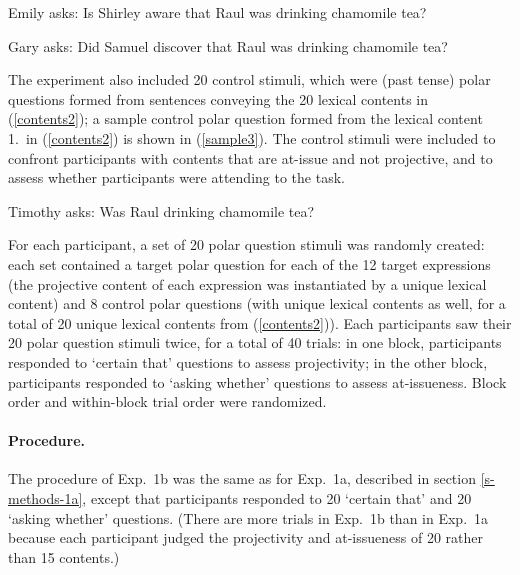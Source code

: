 \documentclass[11pt,fleqn]{article}
\newcommand{\6}{\mbox{$[\hspace*{-.6mm}[$}}
\newcommand{\9}{\mbox{$]\hspace*{-.6mm}]$}}
\begin{document}
\begin{exe}
\ex\label{sample2}
\begin{xlist}
\ex Emily asks: Is Shirley aware that Raul was drinking chamomile tea?

\ex Gary asks: Did Samuel discover that Raul was drinking chamomile tea?
\end{xlist}
\end{exe}

The experiment also included 20 control stimuli, which were (past tense) polar questions formed from sentences conveying the 20 lexical contents in (\ref{contents2}); a sample control polar question formed from the lexical content 1.\ in (\ref{contents2}) is shown in (\ref{sample3}). The control stimuli were included to confront participants with contents that are at-issue and not projective, and to assess whether participants were attending to the task.

\begin{exe}
\ex\label{sample3} Timothy asks: Was Raul drinking chamomile tea?
\end{exe}

For each participant, a set of 20 polar question stimuli was randomly created: each set contained a target polar question for each of the 12 target expressions (the projective content of each expression was instantiated by a unique lexical content) and 8 control polar questions (with unique lexical contents as well, for a total of 20 unique lexical contents from (\ref{contents2})). Each participants saw their 20 polar question stimuli twice, for a total of 40 trials: in one block, participants responded to `certain that' questions to assess projectivity; in the other block, participants responded to `asking whether' questions to assess at-issueness. Block order and within-block trial order were randomized.

\paragraph{Procedure.} The procedure of Exp.~1b was the same as for Exp.~1a, described in section \ref{s-methods-1a}, except that participants responded to 20 `certain that' and 20 `asking whether' questions. (There are more trials in Exp.~1b than in Exp.~1a because each participant judged the projectivity and at-issueness of 20  rather than 15 contents.)
\end{document}

